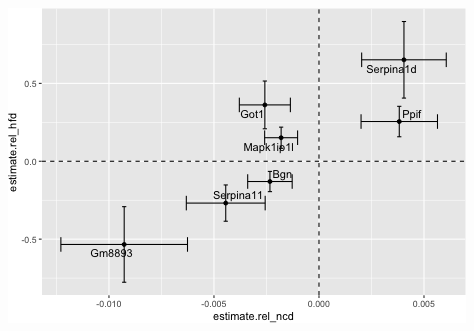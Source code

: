\documentclass[
]{article}
\begin{document}
\includegraphics{figures/twas-chol-integrated-2.png}
\end{document}

